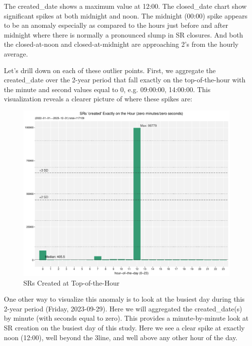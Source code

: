 \documentclass[12pt, titlepage]{article}
\begin{document}
	The created\_date shows a maximum value at 12:00. The closed\_date chart 
	show significant spikes at both midnight and noon. The midnight (00:00) 
	spike appears to be an anomaly especially as compared to the hours just 
	before and after midnight where there is normally a pronounced slump 
	in SR closures. And both the closed-at-noon and closed-at-midnight are 
	approaching 2\textsigma's from the hourly average. 

	Let's drill down on each of these outlier points. First, we aggregate the 
	created\_date over the 2-year period that fall exactly on the top-of-the-hour 
	with the minute and second values equal to 0, e.g. 09:00:00, 14:00:00. 
	This visualization reveals a clearer picture of where these spikes are:
	
	\begin{figure}[tbp]
		\centering
 		\includegraphics[width = \textwidth]
 		{2-year-trend-SR_created_by_top_of_hour.pdf}
		\caption{SRs Created at Top-of-the-Hour}
		\label{fig:tophourcreated}
	\end{figure}	

	One other way to visualize this anomaly is to look at the busiest day 
	during this 2-year period (Friday, 2023-09-29). Here we will aggregated 
	the created\_date(s) by minute (with seconds equal to zero). This 
	provides a minute-by-minute look at SR creation on the busiest day 
	of this study. Here we see a clear spike at exactly noon (12:00), well 
	beyond the 3\textsigma line, and well above any other hour of the day.
	
\end{document}
